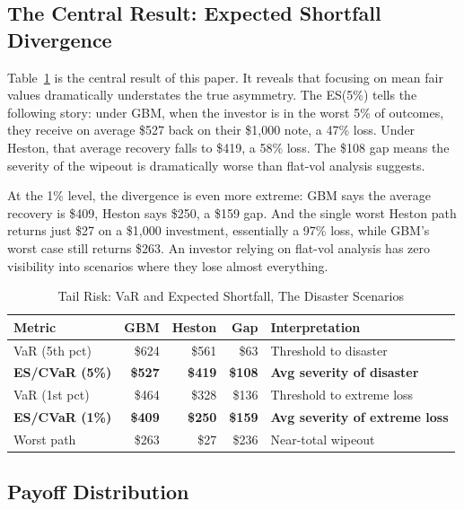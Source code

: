 \documentclass[12pt,a4paper]{article}
\begin{document}
\subsection{The Central Result: Expected Shortfall Divergence}

Table~\ref{tab:es} is the central result of this paper. It reveals that focusing on mean fair values dramatically understates the true asymmetry. The ES(5\%) tells the following story: under GBM, when the investor is in the worst 5\% of outcomes, they receive on average \$527 back on their \$1,000 note, a 47\% loss. Under Heston, that average recovery falls to \$419, a 58\% loss. The \$108 gap means the severity of the wipeout is dramatically worse than flat-vol analysis suggests.

At the 1\% level, the divergence is even more extreme: GBM says the average recovery is \$409, Heston says \$250, a \$159 gap. And the single worst Heston path returns just \$27 on a \$1,000 investment, essentially a 97\% loss, while GBM's worst case still returns \$263. An investor relying on flat-vol analysis has zero visibility into scenarios where they lose almost everything.

\begin{table}[H]
\centering
\caption{Tail Risk: VaR and Expected Shortfall, The Disaster Scenarios}
\label{tab:es}
\begin{tabular}{@{}lrrrl@{}}
\toprule
\textbf{Metric} & \textbf{GBM} & \textbf{Heston} & \textbf{Gap} & \textbf{Interpretation} \\
\midrule
VaR (5th pct) & \$624 & \$561 & \$63 & Threshold to disaster \\
\textbf{ES/CVaR (5\%)} & \textbf{\$527} & \textbf{\$419} & \textbf{\$108} & \textbf{Avg severity of disaster} \\
VaR (1st pct) & \$464 & \$328 & \$136 & Threshold to extreme loss \\
\textbf{ES/CVaR (1\%)} & \textbf{\$409} & \textbf{\$250} & \textbf{\$159} & \textbf{Avg severity of extreme loss} \\
Worst path & \$263 & \$27 & \$236 & Near-total wipeout \\
\bottomrule
\end{tabular}
\end{table}

\subsection{Payoff Distribution}
\end{document}
